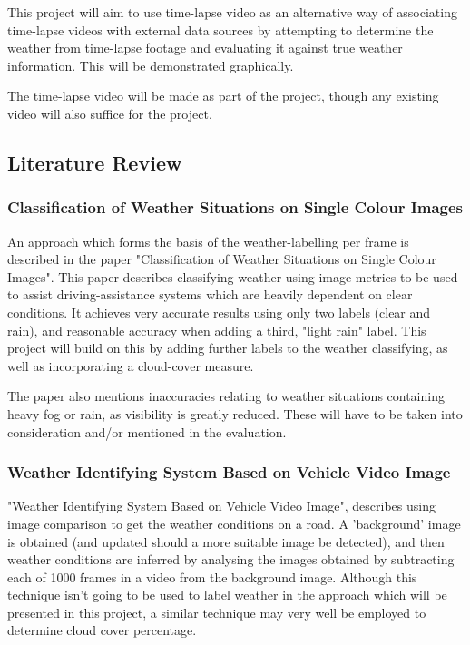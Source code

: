 \documentclass[12pt]{article}
\begin{document}
This project will aim to use time-lapse video as an alternative way of associating time-lapse videos with external data sources by attempting to determine the weather from time-lapse footage and evaluating it against true weather information. This will be demonstrated graphically.

The time-lapse video will be made as part of the project, though any existing video will also suffice for the project.

\subsection*{Literature Review}

\subsubsection*{Classification of Weather Situations on Single Colour Images}

An approach which forms the basis of the weather-labelling per frame is described in the paper "Classification of Weather Situations on Single Colour Images"\cite{classweather}. This paper describes classifying weather using image metrics to be used to assist driving-assistance systems which are heavily dependent on clear conditions. It achieves very accurate results using only two labels (clear and rain), and reasonable accuracy when adding a third, "light rain" label. This project will build on this by adding further labels to the weather classifying, as well as incorporating a cloud-cover measure.

The paper also mentions inaccuracies relating to weather situations containing heavy fog or rain, as visibility is greatly reduced. These will have to be taken into consideration and/or mentioned in the evaluation.

\subsubsection*{Weather Identifying System Based on Vehicle Video Image}

"Weather Identifying System Based on Vehicle Video Image"\cite{weatheridentify}, describes using image comparison to get the weather conditions on a road. A 'background' image is obtained (and updated should a more suitable image be detected), and then weather conditions are inferred by analysing the images obtained by subtracting each of 1000 frames in a video from the background image. Although this technique isn't going to be used to label weather in the approach which will be presented in this project, a similar technique may very well be employed to determine cloud cover percentage.
\end{document}
